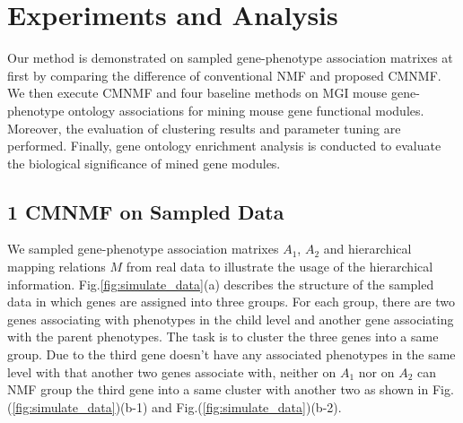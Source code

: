 \documentclass{bmcart}
\begin{document}
\section*{Experiments and Analysis}
Our method is demonstrated on sampled gene-phenotype association matrixes at first by comparing the difference of conventional NMF and proposed CMNMF. We then execute CMNMF and four baseline methods on MGI mouse gene-phenotype ontology associations for mining mouse gene functional modules. Moreover, the evaluation of clustering results and parameter tuning are performed. Finally, gene ontology enrichment analysis is conducted to evaluate the biological significance of mined gene modules.

\subsection*{1 CMNMF on Sampled Data}
We sampled gene-phenotype association matrixes $A_1$, $A_2$ and hierarchical mapping relations $M$ from real data to illustrate the usage of the hierarchical information. Fig.\ref{fig:simulate_data}(a) describes the structure of the sampled data in which genes are assigned into three groups. For each group, there are two genes associating with phenotypes in the child level and another gene associating with the parent phenotypes. The task is to cluster the three genes into a same group. Due to the third gene doesn't have any associated phenotypes in the same level with that another two genes associate with, neither on $A_1$ nor on $A_2$ can NMF group the third gene into a same cluster with another two as shown in Fig.(\ref{fig:simulate_data})(b-1) and Fig.(\ref{fig:simulate_data})(b-2).
\end{document}

